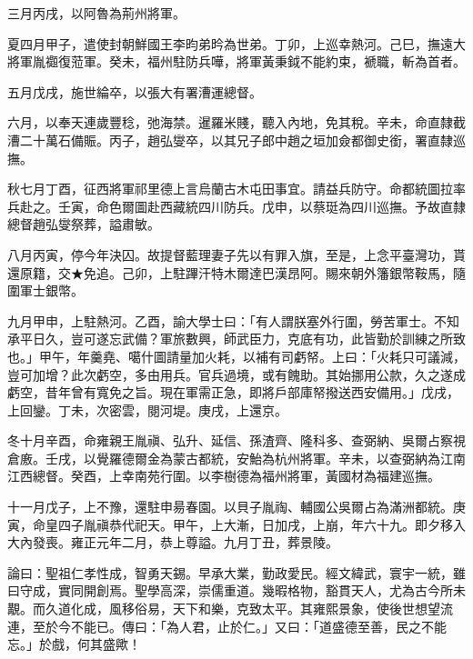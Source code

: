 \begin{pinyinscope}
三月丙戌，以阿魯為荊州將軍。

夏四月甲子，遣使封朝鮮國王李昀弟昑為世弟。丁卯，上巡幸熱河。己巳，撫遠大將軍胤禵復蒞軍。癸未，福州駐防兵嘩，將軍黃秉鉞不能約束，褫職，斬為首者。

五月戊戌，施世綸卒，以張大有署漕運總督。

六月，以奉天連歲豐稔，弛海禁。暹羅米賤，聽入內地，免其稅。辛未，命直隸截漕二十萬石備賑。丙子，趙弘燮卒，以其兄子郎中趙之垣加僉都御史銜，署直隸巡撫。

秋七月丁酉，征西將軍祁里德上言烏蘭古木屯田事宜。請益兵防守。命都統圖拉率兵赴之。壬寅，命色爾圖赴西藏統四川防兵。戊申，以蔡珽為四川巡撫。予故直隸總督趙弘燮祭葬，謚肅敏。

八月丙寅，停今年決囚。故提督藍理妻子先以有罪入旗，至是，上念平臺灣功，貰還原籍，交★免追。己卯，上駐蹕汗特木爾達巴漢昂阿。賜來朝外籓銀幣鞍馬，隨圍軍士銀幣。

九月甲申，上駐熱河。乙酉，諭大學士曰：「有人謂朕塞外行圍，勞苦軍士。不知承平日久，豈可遂忘武備？軍旅數興，師武臣力，克底有功，此皆勤於訓練之所致也。」甲午，年羹堯、噶什圖請量加火耗，以補有司虧帑。上曰：「火耗只可議減，豈可加增？此次虧空，多由用兵。官兵過境，或有餽助。其始挪用公款，久之遂成虧空，昔年曾有寬免之旨。現在軍需正急，即將戶部庫帑撥送西安備用。」戊戌，上回鑾。丁未，次密雲，閱河堤。庚戌，上還京。

冬十月辛酉，命雍親王胤禛、弘升、延信、孫渣齊、隆科多、查弼納、吳爾占察視倉廒。壬戌，以覺羅德爾金為蒙古都統，安鮐為杭州將軍。辛未，以查弼納為江南江西總督。癸酉，上幸南苑行圍。以李樹德為福州將軍，黃國材為福建巡撫。

十一月戊子，上不豫，還駐申昜春園。以貝子胤祹、輔國公吳爾占為滿洲都統。庚寅，命皇四子胤禛恭代祀天。甲午，上大漸，日加戌，上崩，年六十九。即夕移入大內發喪。雍正元年二月，恭上尊謚。九月丁丑，葬景陵。

論曰：聖祖仁孝性成，智勇天錫。早承大業，勤政愛民。經文緯武，寰宇一統，雖曰守成，實同開創焉。聖學高深，崇儒重道。幾暇格物，豁貫天人，尤為古今所未覯。而久道化成，風移俗易，天下和樂，克致太平。其雍熙景象，使後世想望流連，至於今不能已。傳曰：「為人君，止於仁。」又曰：「道盛德至善，民之不能忘。」於戲，何其盛歟！


\end{pinyinscope}